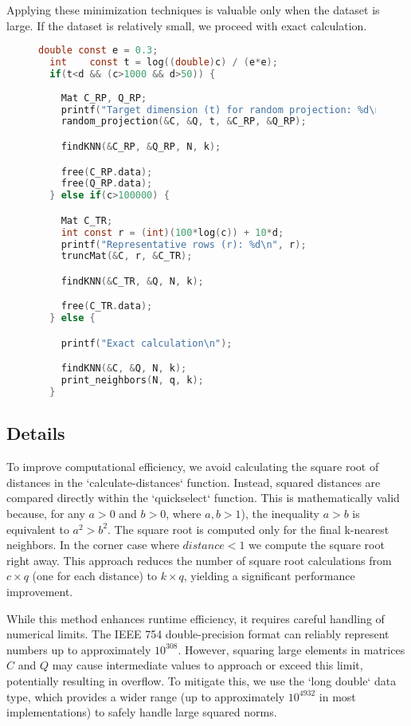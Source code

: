 \documentclass{article}
\begin{document}
Applying these minimization techniques is valuable only when the dataset is large. If the dataset is relatively small, we proceed with exact calculation.


\begin{figure}[H]
\begin{lstlisting}[language=C, caption={Approximation Check}]
  double const e = 0.3;
  int    const t = log((double)c) / (e*e);
  if(t<d && (c>1000 && d>50)) {
    
    Mat C_RP, Q_RP;
    printf("Target dimension (t) for random projection: %d\n", t);
    random_projection(&C, &Q, t, &C_RP, &Q_RP);

    findKNN(&C_RP, &Q_RP, N, k); 

    free(C_RP.data);
    free(Q_RP.data);
  } else if(c>100000) {

    Mat C_TR;
    int const r = (int)(100*log(c)) + 10*d;
    printf("Representative rows (r): %d\n", r);
    truncMat(&C, r, &C_TR);

    findKNN(&C_TR, &Q, N, k);

    free(C_TR.data);
  } else {

    printf("Exact calculation\n");

    findKNN(&C, &Q, N, k); 
    print_neighbors(N, q, k);
  }
\end{lstlisting}
\end{figure}

\subsection{Details}
To improve computational efficiency, we avoid calculating the square root of distances in the `calculate-distances` function. Instead, squared distances are compared directly within the `quickselect` function. This is mathematically valid because, for any \( a > 0 \) and \( b > 0 \), where \(a,b > 1\)), the inequality \( a > b \) is equivalent to \( a^2 > b^2 \). The square root is computed only for the final k-nearest neighbors. In the corner case where \(distance < 1\) we compute the square root right away. This approach reduces the number of square root calculations from \( c \times q \) (one for each distance) to \( k \times q \), yielding a significant performance improvement.

While this method enhances runtime efficiency, it requires careful handling of numerical limits. The IEEE 754 double-precision format can reliably represent numbers up to approximately \( 10^{308} \). However, squaring large elements in matrices \( C \) and \( Q \) may cause intermediate values to approach or exceed this limit, potentially resulting in overflow. To mitigate this, we use the `long double` data type, which provides a wider range (up to approximately \( 10^{4932} \) in most implementations) to safely handle large squared norms.
\end{document}
